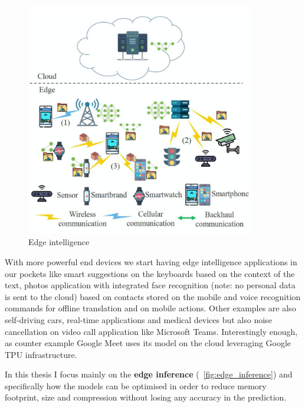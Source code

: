 \begin{figure}[ht]
    \includegraphics[width=10cm]{images/introduction/edge_intelligence.png}
    \centering
    \caption{Edge intelligence}\label{fig:edge_intelligence}
\end{figure}

With more powerful end devices we start having edge intelligence applications
in our pockets like smart suggestions on the keyboards based on the context of
the text, photos application with integrated face recognition (note: no
personal data is sent to the cloud) based on contacts stored on the mobile and
voice recognition commands for offline translation and on mobile actions.
Other examples are also self-driving cars, real-time applications and medical
devices but also noise cancellation on video call application like Microsoft
Teams. Interestingly enough, as counter example Google Meet uses its model on
the cloud leveraging Google TPU infrastructure.

In this thesis I focus mainly on the \textbf{edge inference} (~\ref{fig:edge_inference})
and specifically how the models can be optimised in order to reduce memory
footprint, size and compression without losing any accuracy in the prediction.

